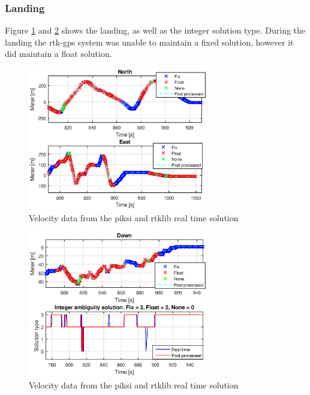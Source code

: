 \subsubsection{Landing}
Figure \ref{figure:landingNorthEastFlight} and \ref{figure:landingDownFlight} shows the landing, as well as the integer solution type. During the landing the \gls{rtk-gps} system was unable to maintain a fixed solution, however it did maintain a float solution.  
\begin{figure}[H]
	\centering
		\includegraphics[width=0.7\textwidth]{figs/plots/landingNorthEastFlight.eps}
		\caption{Velocity data from the piksi and rtklib real time solution}
		\label{figure:landingNorthEastFlight}
\end{figure}
\begin{figure}[H]
	\centering
		\includegraphics[width=0.7\textwidth]{figs/plots/landingDownFlight.eps}
		\caption{Velocity data from the piksi and rtklib real time solution}
		\label{figure:landingDownFlight}
\end{figure}
